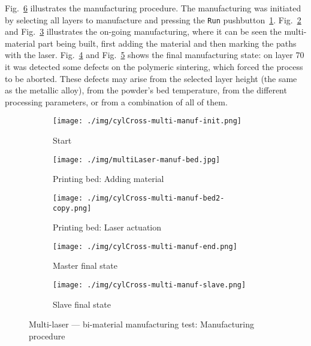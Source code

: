 Fig.~\ref{fig:cylCross-multi-manuf-procedure} illustrates the manufacturing
procedure. The manufacturing was initiated by selecting all layers to manufacture and
pressing the \texttt{Run} pushbutton~\ref{fig:cylCross-multi-manuf-init}.
Fig.~\ref{fig:cylCross-multi-manuf-bed} and Fig.~\ref{fig:cylCross-multi-manuf-bed-2} illustrates the on-going manufacturing,
where it can be seen the multi-material part being built, first adding the
material and then marking the paths with the laser.
Fig.~\ref{fig:cylCross-multi-manuf-end} and
Fig.~\ref{fig:cylCross-multi-manuf-slave} shows the final manufacturing state:
on layer 70 it was detected some defects on the polymeric sintering, which
forced the process to be aborted. These defects may arise from the selected
layer height (the same as the metallic alloy), from the powder's bed
temperature, from the different processing parameters, or from a combination of
all of them.

\begin{figure}[htbp!]
%
  \centering
  \begin{subfigure}[t]{1.0\textwidth}
    \centering
  \texttt{[image: ./img/cylCross-multi-manuf-init.png]}
  \caption{Start}%
  \label{fig:cylCross-multi-manuf-init}
\end{subfigure}
%
  \begin{subfigure}[t]{0.3\textwidth}
  \texttt{[image: ./img/multiLaser-manuf-bed.jpg]}
  \caption{Printing bed: Adding material}%
  \label{fig:cylCross-multi-manuf-bed}
\end{subfigure}
%
  \begin{subfigure}[t]{0.3\textwidth}
    \raggedright%
  \texttt{[image: ./img/cylCross-multi-manuf-bed2-copy.png]}
  \caption{Printing bed: Laser actuation}%
  \label{fig:cylCross-multi-manuf-bed-2}
\end{subfigure}
  \begin{subfigure}[t]{1.0\textwidth}
  \centering
    \texttt{[image: ./img/cylCross-multi-manuf-end.png]}
  \caption{Master final state}%
  \label{fig:cylCross-multi-manuf-end}
  \end{subfigure}
  \begin{subfigure}[t]{1.0\textwidth}
  \centering
    \texttt{[image: ./img/cylCross-multi-manuf-slave.png]}
  \caption{Slave final state}%
  \label{fig:cylCross-multi-manuf-slave}
  \end{subfigure}
  \caption{Multi-laser --- bi-material manufacturing test: Manufacturing procedure}%
  \label{fig:cylCross-multi-manuf-procedure}
\end{figure}

